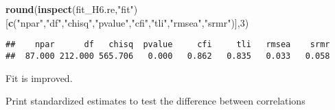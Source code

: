 \documentclass[
]{article}
\newenvironment{Shaded}{\begin{snugshade}}{\end{snugshade}}
\newcommand{\DecValTok}[1]{\textcolor[rgb]{0.00,0.00,0.81}{#1}}
\newcommand{\KeywordTok}[1]{\textcolor[rgb]{0.13,0.29,0.53}{\textbf{#1}}}
\newcommand{\NormalTok}[1]{#1}
\newcommand{\OperatorTok}[1]{\textcolor[rgb]{0.81,0.36,0.00}{\textbf{#1}}}
\newcommand{\StringTok}[1]{\textcolor[rgb]{0.31,0.60,0.02}{#1}}
\begin{document}
\begin{Shaded}
\begin{Highlighting}[]
\KeywordTok{round}\NormalTok{(}\KeywordTok{inspect}\NormalTok{(fit_H6.re,}\StringTok{"fit"}\NormalTok{)}
\NormalTok{      [}\KeywordTok{c}\NormalTok{(}\StringTok{"npar"}\NormalTok{,}\StringTok{"df"}\NormalTok{,}\StringTok{"chisq"}\NormalTok{,}\StringTok{"pvalue"}\NormalTok{,}\StringTok{"cfi"}\NormalTok{,}\StringTok{"tli"}\NormalTok{,}\StringTok{"rmsea"}\NormalTok{,}\StringTok{"srmr"}\NormalTok{)],}\DecValTok{3}\NormalTok{)}
\end{Highlighting}
\end{Shaded}

\begin{verbatim}
##    npar      df   chisq  pvalue     cfi     tli   rmsea    srmr 
##  87.000 212.000 565.706   0.000   0.862   0.835   0.033   0.058
\end{verbatim}

Fit is improved.

Print standardized estimates to test the difference between correlations

\begin{Shaded}
\end{Shaded}
\end{document}
